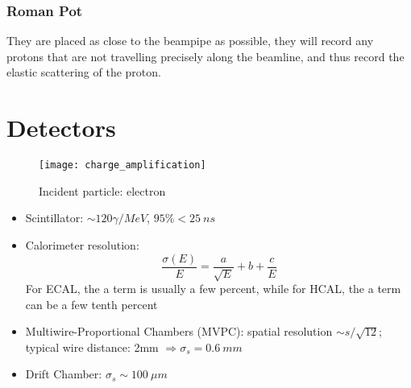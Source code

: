 \subsubsection{Roman Pot}
They are placed as close to the beampipe as possible, they will record any protons
that are not travelling precisely along the beamline, and thus record the elastic
scattering of the proton. 
\section{Detectors}

\begin{figure}
    \texttt{[image: charge\_amplification]}
    \caption{Incident particle: electron}
\end{figure}
\begin{itemize}
    \item Scintillator: $\sim 120 \gamma/MeV$, $95\% < 25\ ns$
    \item Calorimeter resolution:
	$$ \frac{\sigma(E)}{E} = \frac{a}{\sqrt{E}} + b + \frac{c}{E} $$
	For ECAL, the a term is usually a few percent, while for HCAL, the a 
	term can be a few tenth percent
    \item Multiwire-Proportional Chambers (MVPC): spatial resolution $\sim s/\sqrt{12}$;
	typical wire distance: 2mm $\Rightarrow \sigma_s = 0.6\ mm$
    \item Drift Chamber: $\sigma_s \sim 100\ \mu m$
\end{itemize}

